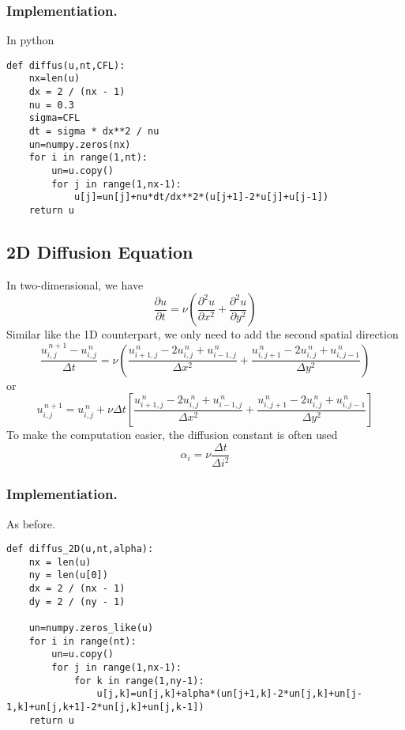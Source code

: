 \documentclass[../../../main.tex]{subfiles}
\begin{document}
\subsubsection*{Implementiation.}
In python
\begin{verbatim}
def diffus(u,nt,CFL):
    nx=len(u)
    dx = 2 / (nx - 1)
    nu = 0.3   
    sigma=CFL
    dt = sigma * dx**2 / nu 
    un=numpy.zeros(nx)
    for i in range(1,nt):
        un=u.copy()
        for j in range(1,nx-1):
            u[j]=un[j]+nu*dt/dx**2*(u[j+1]-2*u[j]+u[j-1])
    return u
\end{verbatim}

\subsection{2D Diffusion Equation}
In two-dimensional, we have
\begin{equation*}
\frac{\partial u}{\partial t} = \nu \left( 
\frac{\partial^2 u}{\partial x^2} + \frac{\partial^2 u}{\partial y^2} 
\right)
\end{equation*}
Similar like the 1D counterpart, we only need to add the second spatial direction
\begin{equation*}
\frac{u_{i,j}^{\,n+1} - u_{i,j}^{\,n}}{\Delta t} 
= \nu \left(
\frac{u_{i+1,j}^{\,n} - 2 u_{i,j}^{\,n} + u_{i-1,j}^{\,n}}{\Delta x^2} 
+ \frac{u_{i,j+1}^{\,n} - 2 u_{i,j}^{\,n} + u_{i,j-1}^{\,n}}{\Delta y^2} 
\right)
\end{equation*}
or 
\begin{equation*}
u_{i,j}^{\,n+1} = u_{i,j}^{\,n} + \nu \Delta t \left[
\frac{u_{i+1,j}^{\,n} - 2 u_{i,j}^{\,n} + u_{i-1,j}^{\,n}}{\Delta x^2} 
+ \frac{u_{i,j+1}^{\,n} - 2 u_{i,j}^{\,n} + u_{i,j-1}^{\,n}}{\Delta y^2}
\right]
\end{equation*}
To make the computation easier, the diffusion constant is often used
\begin{equation*}
    \alpha_i =\nu \frac{\Delta t }{\Delta i^2}
\end{equation*}

\subsubsection{Implementiation.} As before.
\begin{verbatim}
def diffus_2D(u,nt,alpha):
    nx = len(u)       
    ny = len(u[0])    
    dx = 2 / (nx - 1)
    dy = 2 / (ny - 1)

    un=numpy.zeros_like(u)
    for i in range(nt):
        un=u.copy()
        for j in range(1,nx-1):
            for k in range(1,ny-1):
                u[j,k]=un[j,k]+alpha*(un[j+1,k]-2*un[j,k]+un[j-1,k]+un[j,k+1]-2*un[j,k]+un[j,k-1])
    return u
\end{verbatim}
\end{document}
